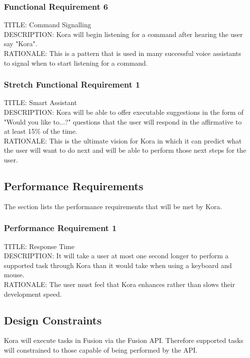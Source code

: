 \documentclass[onecolumn, draftclsnofoot,10pt, compsoc]{IEEEtran}
\def \botname{Kora\xspace}
\begin{document}
        \subsubsection{Functional Requirement 6}
        TITLE: Command Signalling \\
        DESCRIPTION: \botname will begin listening for a command after hearing the user say "\botname". \\
        RATIONALE: This is a pattern that is used in many successful voice assistants to signal when to start listening for a command.

        
        \subsubsection{Stretch Functional Requirement 1}
        TITLE: Smart Assistant \\
        DESCRIPTION: \botname will be able to offer executable suggestions in the form of "Would you like to...?" questions that the user will respond in the affirmative to at least 15\% of the time. \\
        RATIONALE: This is the ultimate vision for \botname in which it can predict what the user will want to do next and will be able to perform those next steps for the user. 
        
    \subsection{Performance Requirements}
        The section lists the performance requirements that will be met by \botname.
        
        \subsubsection{Performance Requirement 1}
        TITLE: Response Time \\
        DESCRIPTION: It will take a user at most one second longer to perform a supported task through \botname than it would take when using a keyboard and mouse. \\
        RATIONALE: The user must feel that \botname enhances rather than slows their development speed.
        
    \subsection{Design Constraints}
        \botname will execute tasks in Fusion via the Fusion API. 
        Therefore supported tasks will constrained to those capable of being performed by the API.
        
\end{document}

